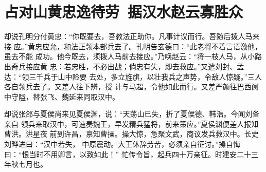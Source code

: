 \chapter{占对山黄忠逸待劳~据汉水赵云寡胜众}

却说孔明分付黄忠：“你既要去，吾教法正助你。凡事计议而行。吾随后拨人马来接
应。”黄忠应允，和法正领本部兵去了。孔明告玄德曰：“此老将不着言语激他，虽去不能
成功。他今既去，须拨人马前去接应。”乃唤赵云：“将一枝人马，从小路出奇兵接应黄
忠：若忠胜，不必出战；倘忠有失，即去救应。”又遣刘封、孟达：“领三千兵于山中险要
去处，多立旌旗，以壮我兵之声势，令敌人惊疑。”三人各自领兵去了。又差人往下辨，授
计与马超，令他如此而行。又差严颜往巴西阆中守隘，替张飞、魏延来同取汉中。

却说张郃与夏侯尚来见夏侯渊，说：“天荡山已失，折了夏侯德、韩浩。今闻刘备亲自
领兵来取汉中，可速奏魏王，早发精兵猛将，前来策应。”夏侯渊便差人报知曹洪。洪星夜
前到许昌，禀知曹操。操大惊，急聚文武，商议发兵救汉中。长史刘晔进曰：“汉中若失，
中原震动。大王休辞劳苦，必须亲自征讨。”操自悔曰：“恨当时不用卿言，以致如此！”
忙传令旨，起兵四十万亲征。时建安二十三年秋七月也。


